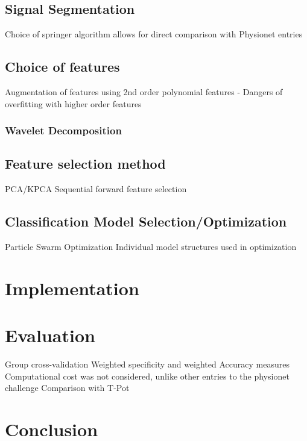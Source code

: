 \documentclass[titlepage, 12pt]{scrartcl} \usepackage{enumitem}
\begin{document}
\subsection{Signal Segmentation}
Choice of springer algorithm allows for direct comparison with Physionet
entries
\subsection{Choice of features}

Augmentation of features using 2nd order polynomial features
- Dangers of overfitting with higher order features
\subsubsection{Wavelet Decomposition}
\subsection{Feature selection method}
PCA/KPCA
Sequential forward feature selection
\subsection{Classification Model Selection/Optimization}
Particle Swarm Optimization
Individual model structures used in optimization

\section{Implementation}
\section{Evaluation}
Group cross-validation
Weighted specificity and weighted Accuracy measures
Computational cost was not considered, unlike other entries to the physionet
challenge
Comparison with T-Pot
\section{Conclusion}



\pagebreak{}
\printbibliography{}
\end{document}
